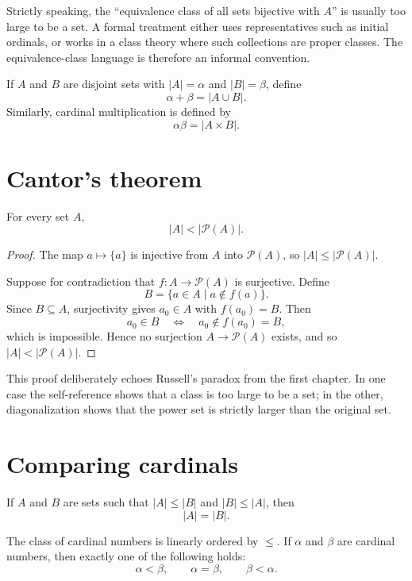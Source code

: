 \begin{caution}
Strictly speaking, the ``equivalence class of all sets bijective with \(A\)'' is usually too large to be a set.  A formal treatment either uses representatives such as initial ordinals, or works in a class theory where such collections are proper classes.  The equivalence-class language is therefore an informal convention.
\end{caution}

If \(A\) and \(B\) are disjoint sets with \(|A|=\alpha\) and \(|B|=\beta\), define
\[
  \alpha+\beta=|A\cup B|.
\]
Similarly, cardinal multiplication is defined by
\[
  \alpha\beta=|A\times B|.
\]

\section{Cantor's theorem}

\begin{theorem}[Cantor]
For every set \(A\),
\[
  |A|<|\mathcal P(A)|.
\]
\end{theorem}

\begin{proof}
The map \(a\mapsto\{a\}\) is injective from \(A\) into \(\mathcal P(A)\), so \(|A|\le |\mathcal P(A)|\).

Suppose for contradiction that \(f:A\to\mathcal P(A)\) is surjective.  Define
\[
  B=\{a\in A\mid a\notin f(a)\}.
\]
Since \(B\subseteq A\), surjectivity gives \(a_0\in A\) with \(f(a_0)=B\).  Then
\[
  a_0\in B \quad\Longleftrightarrow\quad a_0\notin f(a_0)=B,
\]
which is impossible.  Hence no surjection \(A\to\mathcal P(A)\) exists, and so \(|A|<|\mathcal P(A)|\).
\end{proof}

This proof deliberately echoes Russell's paradox from the first chapter.  In one case the self-reference shows that a class is too large to be a set; in the other, diagonalization shows that the power set is strictly larger than the original set.

\section{Comparing cardinals}

\begin{theorem}
If \(A\) and \(B\) are sets such that \(|A|\le |B|\) and \(|B|\le |A|\), then
\[
  |A|=|B|.
\]
\end{theorem}

\begin{theorem}
The class of cardinal numbers is linearly ordered by \(\le\).  If \(\alpha\) and \(\beta\) are cardinal numbers, then exactly one of the following holds:
\[
  \alpha<\beta,\qquad \alpha=\beta,\qquad \beta<\alpha.
\]
\end{theorem}

